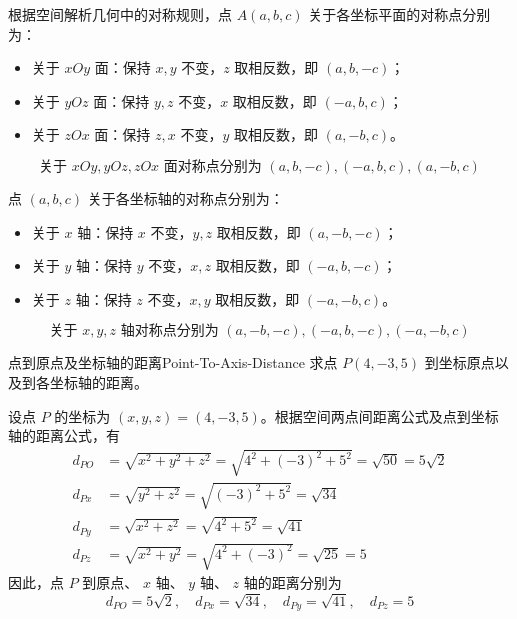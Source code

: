 \begin{solution}
    根据空间解析几何中的对称规则，点 $A(a, b, c)$ 关于各坐标平面的对称点分别为：
    \begin{itemize}
        \item 关于 $xOy$ 面：保持 $x, y$ 不变，$z$ 取相反数，即 $(a, b, -c)$；
        \item 关于 $yOz$ 面：保持 $y, z$ 不变，$x$ 取相反数，即 $(-a, b, c)$；
        \item 关于 $zOx$ 面：保持 $z, x$ 不变，$y$ 取相反数，即 $(a, -b, c)$。
    \end{itemize}
    \begin{equation*}
        \boxed{\text{关于 } xOy, yOz, zOx \text{ 面对称点分别为 } (a, b, -c), (-a, b, c), (a, -b, c)}
    \end{equation*}

    点 $(a, b, c)$ 关于各坐标轴的对称点分别为：
    \begin{itemize}
        \item 关于 $x$ 轴：保持 $x$ 不变，$y, z$ 取相反数，即 $(a, -b, -c)$；
        \item 关于 $y$ 轴：保持 $y$ 不变，$x, z$ 取相反数，即 $(-a, b, -c)$；
        \item 关于 $z$ 轴：保持 $z$ 不变，$x, y$ 取相反数，即 $(-a, -b, c)$。
    \end{itemize}
    \begin{equation*}
        \boxed{\text{关于 } x, y, z \text{ 轴对称点分别为 } (a, -b, -c), (-a, b, -c), (-a, -b, c)}
    \end{equation*}
\end{solution}


\begin{problem}{点到原点及坐标轴的距离}{Point-To-Axis-Distance}
    求点 $P(4, -3, 5)$ 到坐标原点以及到各坐标轴的距离。
\end{problem}

\begin{solution}
    设点 $P$ 的坐标为 $(x, y, z) = (4, -3, 5)$。根据空间两点间距离公式及点到坐标轴的距离公式，有
    \begin{equation*}
        \begin{aligned}
            d_{PO} & = \sqrt{x^2 + y^2 + z^2} = \sqrt{4^2 + (-3)^2 + 5^2} = \sqrt{50} = 5\sqrt{2} \\
            d_{Px} & = \sqrt{y^2 + z^2} = \sqrt{(-3)^2 + 5^2} = \sqrt{34}                         \\
            d_{Py} & = \sqrt{x^2 + z^2} = \sqrt{4^2 + 5^2} = \sqrt{41}                            \\
            d_{Pz} & = \sqrt{x^2 + y^2} = \sqrt{4^2 + (-3)^2} = \sqrt{25} = 5
        \end{aligned}
    \end{equation*}
    因此，点 $P$ 到原点、 $x$ 轴、 $y$ 轴、 $z$ 轴的距离分别为
    \begin{equation*}
        \boxed{d_{PO} = 5\sqrt{2}, \quad d_{Px} = \sqrt{34}, \quad d_{Py} = \sqrt{41}, \quad d_{Pz} = 5}
    \end{equation*}
\end{solution}

